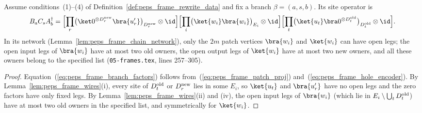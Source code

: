 \begin{lemma}
    \label{lem:peps_frame_branch_network}
    \leanok
    Assume conditions~(1)--(4) of Definition~\ref{def:peps_frame_rewrite_data} and fix a branch $\beta=(a,s,b)$. Its site operator is
    \begin{align}
        B_aC_sA_b^\dagger
        =\Bigl[\prod_r\bigl(\ket0^{\otimes D^{\rm new}_r}\bra{u'_r}\bigr)_{D^{\rm new}_r}\otimes\id\Bigr]
        \Bigl[\prod_i\bigl(\ket{w_i}\bra{w_i}\bigr)_{E_i}\otimes\id\Bigr]
        \Bigl[\prod_t\bigl(\ket{u_t}\bra0^{\otimes D^{\rm old}_t}\bigr)_{D^{\rm old}_t}\otimes\id\Bigr].
        \label{eq:peps_frame_branch_factors}
    \end{align}
    In its network (Lemma~\ref{lem:peps_frame_chain_network}), only the $2m$ patch vertices $\bra{w_i}$ and $\ket{w_i}$ can have open legs; the open input legs of $\bra{w_i}$ have at most
    two old owners, the open output legs of $\ket{w_i}$ have at most two new
    owners, and all these owners belong to the specified list
    (\texttt{05-frames.tex}, lines 257--305).
\end{lemma}

\begin{proof}\leanok
    Equation~(\ref{eq:peps_frame_branch_factors}) follows from~(\ref{eq:peps_frame_patch_proj}) and~(\ref{eq:peps_frame_hole_encoder}). By Lemma~\ref{lem:peps_frame_wires}(i), every site of $D^{\rm old}_t$ or $D^{\rm new}_r$ lies in some $E_i$, so $\ket{u_t}$ and $\bra{u'_r}$ have no open legs and the zero factors have only fixed legs. By Lemma~\ref{lem:peps_frame_wires}(ii) and (iv), the open input legs of $\bra{w_i}$ (which lie in $E_i\setminus\bigcup_t D^{\rm old}_t$) have at most two old owners in the specified list, and symmetrically for $\ket{w_i}$.
\end{proof}

